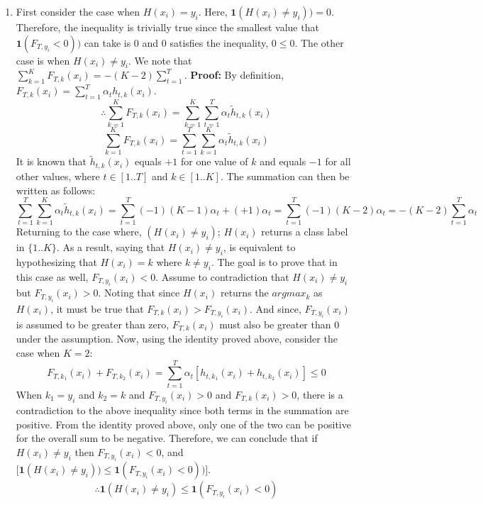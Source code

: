 \documentclass[english]{article}
\begin{document}
\begin{enumerate}
    \item First consider the case when $H(x_i) = y_i$. Here, $\textbf{1}(H(x_i) \neq y_i)) = 0$. Therefore, the inequality is trivially true since the smallest value that $\textbf{1}(F_{T,y_i} < 0))$ can take is $0$ and $0$ satisfies the inequality, $0 \leq 0$. \newline
    The other case is when $H(x_i) \neq y_i$. We note that $\sum_{k=1}^K F_{T,k}(x_i) = -(K - 2) \sum_{t = 1}^{T}$.  \newline
    \newline \textbf{Proof:} By definition, $F_{T,k}(x_i) = \sum_{t=1}^{T} \alpha_th_{t,k}(x_i)$. 
    $$\therefore \sum_{k=1}^{K} F_{T,k}(x_i) = \sum_{k=1}^{K} \sum_{t=1}^{T} \alpha_t\widetilde{h}_{t,k}(x_i)$$
    $$\sum_{k=1}^{K} F_{T,k}(x_i) =  \sum_{t=1}^{T} \sum_{k=1}^{K} \alpha_t\widetilde{h}_{t,k}(x_i)$$ 
    It is known that $\widetilde{h}_{t,k}(x_i)$ equals $+1$ for one value of $k$ and equals $-1$ for all other values, where $t \in [1..T]$ and $k \in [1..K]$. The summation can then be written as follows:
    $$\sum_{t=1}^{T} \sum_{k=1}^{K} \alpha_t\widetilde{h}_{t,k}(x_i) = \sum_{t=1}^{T} (-1)(K-1)\alpha_t + (+1)\alpha_t = \sum_{t=1}^{T} (-1)(K-2)\alpha_t = -(K-2)\sum_{t=1}^{T} \alpha_t$$
    Returning to the case where, $(H(x_i) \neq y_i)$; $H(x_i)$ returns a class label in $\{1..K\}$. As a result, saying that $H(x_i) \neq y_i$, is equivalent to hypothesizing that $H(x_i) = k$ where $k \neq y_i$. The goal is to prove that in this case as well, $F_{T,y_i}(x_i) < 0$. Assume to contradiction that $H(x_i) \neq y_i$ but $F_{T,y_i}(x_i) > 0$. Noting that since $H(x_i)$ returns the $argmax_k$ as $H(x_i)$, it must be true that $F_{T,k}(x_i) > F_{T,y_i}(x_i)$. And since, $F_{T,y_i}(x_i)$ is assumed to be greater than zero, $F_{T,k}(x_i)$ must also be greater than $0$ under the assumption. 
    Now, using the identity proved above, consider the case when $K = 2$:
    $$F_{T,k_1}(x_i) + F_{T,k_2}(x_i) = \sum_{t=1}^{T} \alpha_t [h_{t,k_1}(x_i) + h_{t,k_2}(x_i)] \leq 0$$  
    When $k_1 = y_i$ and $k_2 = k$ and $F_{T,y_i}(x_i) > 0$ and $F_{T,k}(x_i) > 0$, there is a contradiction to the above inequality since both terms in the summation are positive. From the identity proved above, only one of the two can be positive for the overall sum to be negative. Therefore, we can conclude that if $H(x_i) \neq y_i$ then $F_{T,y_i}(x_i) < 0$, and $\big[\textbf{1}(H(x_i) \neq y_i)) \leq \textbf{1}(F_{T,y_i}(x_i) < 0))\big]$. 
    $$\therefore \textbf{1}(H(x_i) \neq y_i) \leq \textbf{1}(F_{T,y_i}(x_i) < 0)$$


\end{enumerate}
\end{document}
